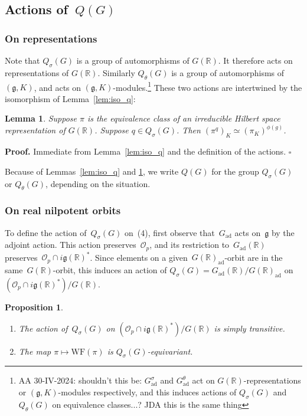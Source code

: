 \documentclass[10pt,leqno]{article}
\newtheorem{lemma}[equation]{Lemma}
\newtheorem{proposition}[equation]{Proposition}
\newcommand{\qed}{\hfill $\square$ \medskip}
\newenvironment{proof}[1][Proof]{\noindent\textbf{#1.} }{\qed}
\newcommand{\Gad}{G_\mathrm{ad}}
\renewcommand{\O}{\mathcal O}
\newcommand{\R}{\mathbb R}
\newcommand{\g}{\mathfrak g}
\newcommand{\WF}{\mathrm{WF}}
\newcommand{\Op}{\O_p}
\begin{document}
\subsection{Actions of~$Q(G)$}


\subsubsection*{On representations} 



Note that $Q_\sigma(G)$ is a group of automorphisms of $G(\R)$. It therefore acts on representations of $G(\R)$. 
Similarly $Q_\theta(G)$ is a group of automorphisms of $(\g,K)$, and acts on $(\g,K)$-modules.\footnote{AA 30-IV-2024: shouldn't this be:  $\Gad^\sigma$ and $\Gad^\theta$  act on $G(\R)$-representations or $(\g,K)$-modules respectively, and this induces actions of $Q_{\sigma}(G)$ and $Q_{\theta}(G)$ on equivalence classes...? JDA this is the same thing}
These two actions are intertwined by the isomorphism of Lemma~\ref{lem:iso_q}:

\begin{lemma}\label{lem:action_q}
Suppose $\pi$ is the equivalence class of an irreducible Hilbert space representation of $G(\R)$. 
Suppose $q\in Q_\sigma(G)$. 
Then $(\pi^q)_K\simeq (\pi_K)^{\phi(g)}$.
\end{lemma}

\begin{proof}
Immediate from Lemma~\ref{lem:iso_q} and the definition of the actions.
\end{proof}


Because of Lemmas~\ref{lem:iso_q} and \ref{lem:action_q}, we write $Q(G)$ for the group $Q_\sigma(G)$ or $Q_\theta(G)$, depending on the situation.



\subsubsection*{On real nilpotent orbits} 

To define the action of~$Q_{\sigma}(G)$ on~(4), first observe that~$\Gad$ acts on~$\g$ by the adjoint action. This action preserves~$\Op$, and its restriction to~$\Gad(\R)$ preserves~$\Op\cap i\g(\R)^*$. Since elements on a given~$G(\R)_{\mathrm{ad}}$-orbit are in the same~$G(\R)$-orbit, this induces an action of $Q_{\sigma}(G)=\Gad(\R)/G(\R)_{\mathrm{ad}}$ on~$(\Op\cap i\g(\R)^*)/G(\R)$.

\begin{proposition}\label{prop:action_on_real_orbits}
\begin{enumerate} 
\item The action of~$Q_{\sigma}(G)$ on $(\Op\cap i\g(\R)^*)/G(\R)$ is simply transitive.
\item The map $\pi \mapsto \WF(\pi)$ is $Q_{\sigma}(G)$-equivariant.
\end{enumerate}
\end{proposition}
\end{document}
